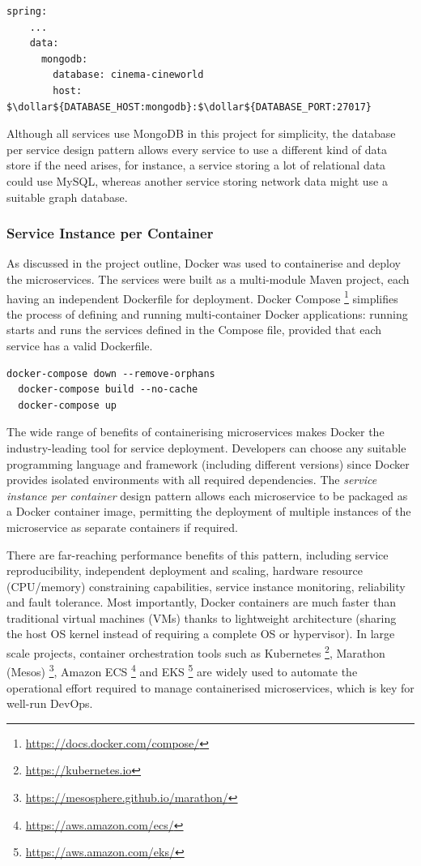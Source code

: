 \begin{lstlisting}[caption=Snippet from Cineworld cinema's application properties.]
  spring:
    ...
    data:
      mongodb:
        database: cinema-cineworld
        host: $\dollar${DATABASE_HOST:mongodb}:$\dollar${DATABASE_PORT:27017}
\end{lstlisting}

Although all services use MongoDB in this project for simplicity, the database per service design pattern allows every service to use a different kind of data store if the need arises, for instance, a service storing a lot of relational data could use MySQL, whereas another service storing network data might use a suitable graph database.

\subsubsection{Service Instance per Container}

As discussed in the project outline, Docker was used to containerise and deploy the microservices. The services were built as a multi-module Maven project, each having an independent Dockerfile for deployment. Docker Compose \footnote{\url{https://docs.docker.com/compose/}} simplifies the process of defining and running multi-container Docker applications: running  starts and runs the services defined in the Compose file, provided that each service has a valid Dockerfile.

\begin{lstlisting}[caption=Sample Docker Compose commands to start the microservices.]
  docker-compose down --remove-orphans
  docker-compose build --no-cache
  docker-compose up
\end{lstlisting}

The wide range of benefits of containerising microservices makes Docker the industry-leading tool for service deployment. Developers can choose any suitable programming language and framework (including different versions) since Docker provides isolated environments with all required dependencies. The \textit{service instance per container} design pattern allows each microservice to be packaged as a Docker container image, permitting the deployment of multiple instances of the microservice as separate containers if required.

There are far-reaching performance benefits of this pattern, including service reproducibility, independent deployment and scaling, hardware resource (CPU/memory) constraining capabilities, service instance monitoring, reliability and fault tolerance. Most importantly, Docker containers are much faster than traditional virtual machines (VMs) thanks to lightweight architecture (sharing the host OS kernel instead of requiring a complete OS or hypervisor). In large scale projects, container orchestration tools such as Kubernetes \footnote{\url{https://kubernetes.io}}, Marathon (Mesos) \footnote{\url{https://mesosphere.github.io/marathon/}}, Amazon ECS \footnote{\url{https://aws.amazon.com/ecs/}} and EKS \footnote{\url{https://aws.amazon.com/eks/}} are widely used to automate the operational effort required to manage containerised microservices, which is key for well-run DevOps.

